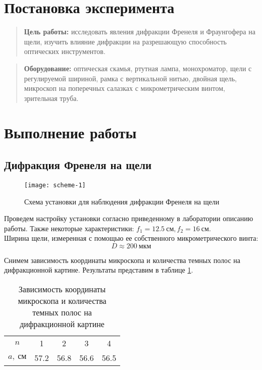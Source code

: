\documentclass{lab}
\begin{document}

\section*{Постановка эксперимента}

\begin{quote}
	\textbf{{\normalsize Цель работы: }}
	исследовать явления дифракции Френеля и Фраунгофера на щели, изучить влияние дифракции на разрешающую способность оптических инструментов.
\end{quote}

\begin{quote}
	\textbf{{\normalsize Оборудование: }}
	оптическая скамья, ртутная лампа, монохроматор, щели с регулируемой шириной, рамка с вертикальной нитью, двойная щель, микроскоп на поперечных салазках с микрометрическим винтом, зрительная труба.
\end{quote}

\section*{Выполнение работы}

\subsection*{Дифракция Френеля на щели}

\begin{figure}[H]
	\centering
	\texttt{[image: scheme-1]}
	\caption{Схема установки для наблюдения дифракции Френеля на щели}
	\label{scheme-1}
\end{figure}

Проведем настройку установки согласно приведенному в лаборатории описанию работы. Также некоторые характеристики: $ f_1 = 12.5~см, f_2 = 16~см $.\\

Ширина щели, измеренная с помощью ее собственного микрометрического винта:
\begin{equation}
D \approx 200~мкм
\end{equation}

Снимем зависимость координаты микроскопа и количества темных полос на дифракционной картине. Результаты представим в таблице \ref{tab-1}.
\begin{table}[H]
	\centering
	\begin{tabular}{|c|cccc|}
		\hline
		$ n $ & 1 & 2 & 3 & 4 \\
		$ a,~см $ & 57.2 & 56.8 & 56.6 & 56.5 \\ \hline
	\end{tabular}
	\caption{Зависимость координаты микроскопа и количества темных полос на дифракционной картине}
	\label{tab-1}
\end{table}
\end{document}
